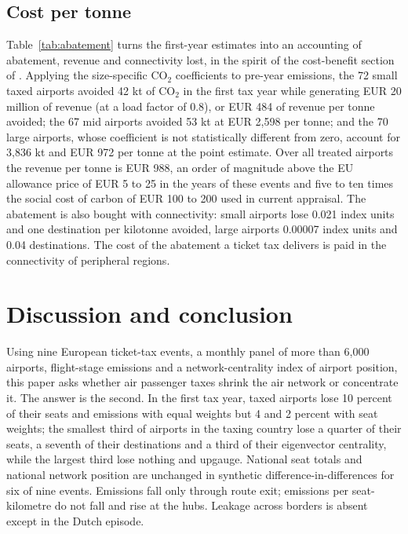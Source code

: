 \subsection{Cost per tonne}

Table~\ref{tab:abatement} turns the first-year estimates into an accounting of abatement, revenue and
connectivity lost, in the spirit of the cost-benefit section of \citet{li2019subway}. Applying the size-specific CO$_2$ coefficients to pre-year emissions, the 72 small taxed airports avoided 42 kt of CO$_2$
in the first tax year while generating EUR 20 million of revenue (at a load factor of 0.8), or EUR 484
of revenue per tonne avoided; the 67 mid airports avoided 53 kt at EUR 2,598 per tonne; and the 70
large airports, whose coefficient is not statistically different from zero, account for 3,836 kt and EUR
972 per tonne at the point estimate. Over all treated airports the revenue per tonne is EUR 988, an
order of magnitude above the EU allowance price of EUR 5 to 25 in the years of these events and five to
ten times the social cost of carbon of EUR 100 to 200 used in current appraisal. The abatement is also
bought with connectivity: small airports lose 0.021 index units and one destination per kilotonne
avoided, large airports 0.00007 index units and 0.04 destinations. The cost of the abatement a ticket
tax delivers is paid in the connectivity of peripheral regions.

\section{Discussion and conclusion}
\label{sec:conclusion}

Using nine European ticket-tax events, a monthly panel of more than 6,000 airports, flight-stage
emissions and a network-centrality index of airport position, this paper asks whether air passenger
taxes shrink the air network or concentrate it. The answer is the second. In the first tax year, taxed
airports lose 10 percent of their seats and emissions with equal weights but 4 and 2 percent with seat
weights; the smallest third of airports in the taxing country lose a quarter of their seats, a seventh of
their destinations and a third of their eigenvector centrality, while the largest third lose nothing and
upgauge. National seat totals and national network position are unchanged in synthetic
difference-in-differences for six of nine events. Emissions fall only through route exit; emissions per
seat-kilometre do not fall and rise at the hubs. Leakage across borders is absent except in the Dutch
episode.

